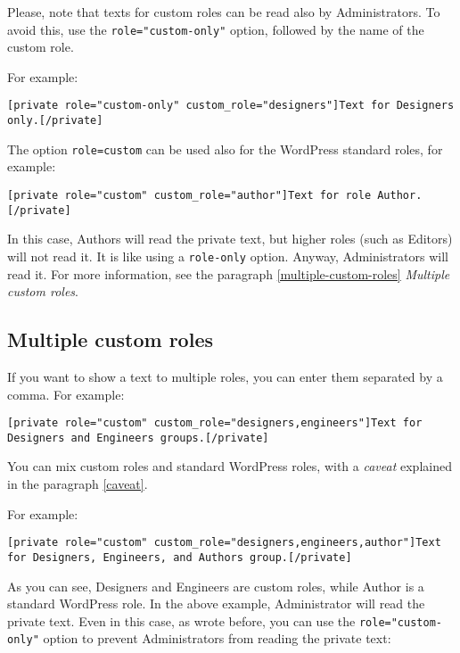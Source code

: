 Please, note that texts for custom roles can be read also by Administrators. To
avoid this, use the \verb+role="custom-only"+ option, followed by the name of
the custom role.

For example:

\begin{lstlisting}
[private role="custom-only" custom_role="designers"]Text for Designers only.[/private]
\end{lstlisting}

The option \verb+role=custom+ can be used also for the WordPress standard roles,
for example:

\begin{lstlisting}
[private role="custom" custom_role="author"]Text for role Author.[/private]
\end{lstlisting}

In this case, Authors will read the private text, but higher roles (such as
Editors) will not read it. It is like using a \verb+role-only+ option. Anyway,
Administrators will read it. For more information, see the paragraph
\vref{multiple-custom-roles} \textit{Multiple custom roles}.

\subsection{Multiple custom roles}\label{multiple-custom-roles}

If you want to show a text to multiple roles, you can enter them separated by a
comma. For example:

\begin{lstlisting}
[private role="custom" custom_role="designers,engineers"]Text for Designers and Engineers groups.[/private]
\end{lstlisting}

You can mix custom roles and standard WordPress roles, with a \textit{caveat}
explained in the paragraph \vref{caveat}.

For example:

\begin{lstlisting}
[private role="custom" custom_role="designers,engineers,author"]Text for Designers, Engineers, and Authors group.[/private]
\end{lstlisting}

As you can see, Designers and Engineers are custom roles, while Author is a
standard WordPress role. In the above example, Administrator will read the
private text. Even in this case, as wrote before, you can use the
\verb+role="custom-only"+ option to prevent Administrators from reading the
private text:

